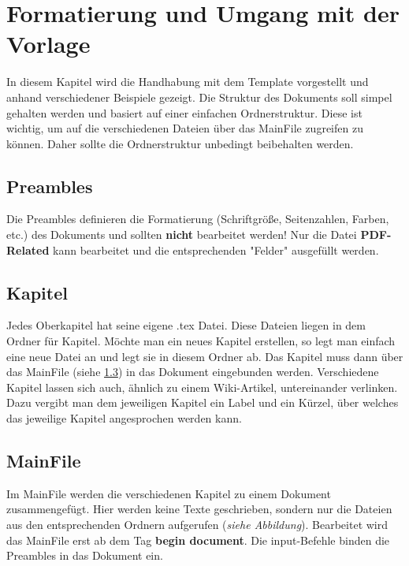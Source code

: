 
\chapter{Formatierung und Umgang mit der Vorlage}
In diesem Kapitel wird die Handhabung mit dem Template vorgestellt und anhand verschiedener Beispiele gezeigt. Die Struktur des Dokuments soll simpel gehalten werden und basiert auf einer einfachen Ordnerstruktur. Diese ist wichtig, um auf die verschiedenen Dateien über das MainFile zugreifen zu können. Daher sollte die Ordnerstruktur unbedingt beibehalten werden.

\section{Preambles}
Die Preambles definieren die Formatierung (Schriftgröße, Seitenzahlen, Farben, etc.) des Dokuments und sollten \textbf{nicht} bearbeitet werden! Nur die Datei \textbf{PDF-Related} kann bearbeitet und die entsprechenden "Felder" ausgefüllt werden.

\section{Kapitel}
Jedes Oberkapitel hat seine eigene .tex Datei. Diese Dateien liegen in dem Ordner für Kapitel. Möchte man ein neues Kapitel erstellen, so legt man einfach eine neue Datei an und legt sie in diesem Ordner ab. Das Kapitel muss dann über das MainFile (siehe \ref{cha:mainFile}) in das Dokument eingebunden werden. Verschiedene Kapitel lassen sich auch, ähnlich zu einem Wiki-Artikel, untereinander verlinken. Dazu vergibt man dem jeweiligen Kapitel ein Label und ein Kürzel, über welches das jeweilige Kapitel angesprochen werden kann.

\section{MainFile}\label{cha:mainFile}
Im MainFile werden die verschiedenen Kapitel zu einem Dokument zusammengefügt. Hier werden keine Texte geschrieben, sondern nur die Dateien aus den entsprechenden Ordnern aufgerufen (\emph{siehe Abbildung}). Bearbeitet wird das MainFile erst ab dem Tag \textbf{begin document}. Die input-Befehle binden die Preambles in das Dokument ein.

